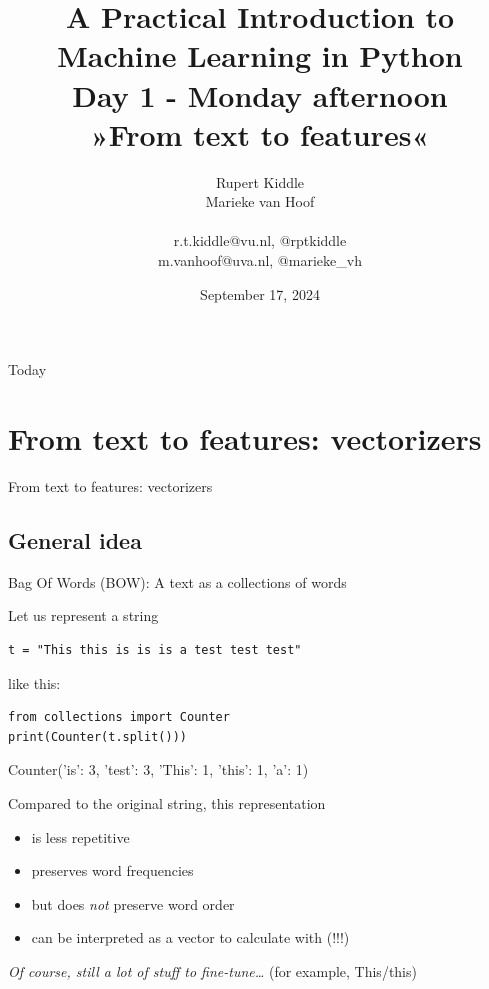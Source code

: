 \documentclass[compress]{beamer}
\title[Big Data and Automated Content Analysis]{\textbf{A Practical Introduction to Machine Learning in Python} \\Day 1 - Monday  afternoon \\ »From text to features«}
\author[Rupert Kiddle, Marieke van Hoof]{Rupert Kiddle \\ Marieke van Hoof \\ ~ \\ \footnotesize{r.t.kiddle@vu.nl, @rptkiddle \\ m.vanhoof@uva.nl, @marieke\_vh} \\}
\date{September 17, 2024}
\institute[Gesis]{Gesis}
\begin{document}
	
	\begin{frame}{}
	\titlepage
\end{frame}

\begin{frame}{Today}
\tableofcontents
\end{frame}


\section{From text to features: vectorizers}
\begin{frame}[plain]
From text to features: vectorizers
\end{frame}	



\subsection{General idea}

\begin{frame}[fragile]{Bag Of Words (BOW): A text as a collections of words}

Let us represent a string 
\begin{lstlisting}
t = "This this is is is a test test test"
\end{lstlisting}
like this:\\
\begin{lstlisting}
from collections import Counter
print(Counter(t.split()))
\end{lstlisting}
\begin{lstlistingoutput}
Counter({'is': 3, 'test': 3, 'This': 1, 'this': 1, 'a': 1})
\end{lstlistingoutput}

\pause 
Compared to the original string, this representation
\begin{itemize}
	\item is less repetitive
	\item preserves word frequencies
	\item but does \emph{not} preserve word order
	\item can be interpreted as a vector to calculate with (!!!)
\end{itemize}

\tiny{\emph{Of course, still a lot of stuff to fine-tune\ldots}  (for example, This/this)}
\end{frame}
\end{document}
